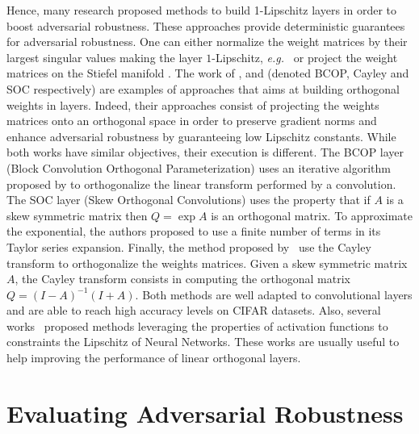 Hence, many research proposed methods to build 1-Lipschitz layers in order to boost adversarial robustness. These approaches provide deterministic guarantees for adversarial robustness. One can either normalize the weight matrices by their largest singular values making the layer $1$-Lipschitz, \emph{e.g.}~\citep{yoshida2017spectral,miyato2018spectral,farnia2018generalizable,anil2019sorting} or project the weight matrices on the Stiefel manifold \citep{li2019preventing,trockman2021orthogonalizing,skew2021sahil}.
The work of \citet{li2019preventing}, \citet{trockman2021orthogonalizing} and \citet{skew2021sahil} (denoted BCOP, Cayley and SOC respectively) are examples of approaches that aims at building orthogonal weights in layers.
Indeed, their approaches consist of projecting the weights matrices onto an orthogonal space in order to preserve gradient norms and enhance adversarial robustness by guaranteeing low Lipschitz constants. 
While both works have similar objectives, their execution is different.
The BCOP layer (Block Convolution Orthogonal Parameterization) uses an iterative algorithm proposed by \citet{bjorck1971iterative} to orthogonalize the linear transform performed by a convolution.
The SOC layer (Skew Orthogonal Convolutions) uses the property that if $A$ is a skew symmetric matrix then $Q=\exp{A}$ is an orthogonal matrix. To approximate the exponential, the authors proposed to use a finite number of terms in its Taylor series expansion.
Finally, the method proposed by~\citet{trockman2021orthogonalizing} use the Cayley transform to orthogonalize the weights matrices.
Given a skew symmetric matrix $A$, the Cayley transform consists in computing the orthogonal matrix $Q = (I - A)^{-1} (I + A)$. Both methods are well adapted to convolutional layers and are able to reach high accuracy levels on CIFAR datasets. Also, several works~\cite{anil2019sorting,singla2021householder,huang2021local} proposed methods leveraging the properties of activation functions to constraints the Lipschitz of Neural Networks. These works are usually useful to help  improving the performance of linear orthogonal layers.


\section{Evaluating Adversarial Robustness}


